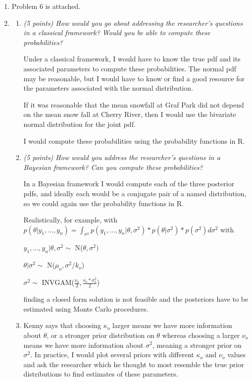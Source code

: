 \documentclass{article}\usepackage[]{graphicx}\usepackage[]{color}
\begin{document}
\begin{enumerate}
\item%

Problem 6 is attached.

\item%

\begin{enumerate}
\item%
{\it (5 points) How would you go about addressing the researcher's questions in a classical
framework? Would you be able to compute these probabilities?}

Under a classical framework, I would have to know the true pdf and its associated parameters to compute these probabilities. The normal pdf may be reasonable, but I would have to know or find a good resource for the parameters associated with the normal distribution.

If it was reasonable that the mean snowfall at Graf Park did not depend on the mean snow fall at Cherry River, then I would use the bivariate normal distribution for the joint pdf. 











I would compute these probabilities using the probability functions in R.

\item%
{\it (5 points) How would you address the researcher's questions in a Bayesian framework? Can you compute these probabilities?}

In a Bayesian framework I would compute each of the three posterior pdfs, and ideally each would be a conjugate pair of a named distribution, so we could again use the probability functions in R.

Realistically, for example, with $p(\theta|y_{1},...,y_{n}) = \int_{\sigma^{2}}p(y_{1},...,y_{n}|\theta,\sigma^{2})*p(\theta|\sigma^{2})*p(\sigma^{2}) d\sigma^{2}$ with

$y_{1},...,y_{n}|\theta,\sigma^{2} \sim$ N($\theta,\sigma^{2})$

$\theta|\sigma^{2} \sim$ N($\mu_{o},\sigma^2/k_{o}$)

$\sigma^{2} \sim$ INVGAM($\frac{\nu_{o}}{2},\frac{\nu_{o}*\sigma_{o}^2}{2}$)

finding a closed form solution is not feasible and the posteriors have to be estimated using Monte Carlo procedures.

\item%
Kenny says that choosing $\kappa_{o}$ larger means we have more information about $\theta$, or a stronger prior distribution on $\theta$ whereas choosing a larger $\nu_{o}$ means we have more information about $\sigma^{2}$, meaning a stronger prior on $\sigma^{2}$. In practice, I would plot several priors with different $\kappa_{o}$ and $\nu_{o}$ values and ask the researcher which he thought to most resemble the true prior distributions to find estimates of these parameters.


\end{enumerate}
\end{enumerate}
\end{document}
